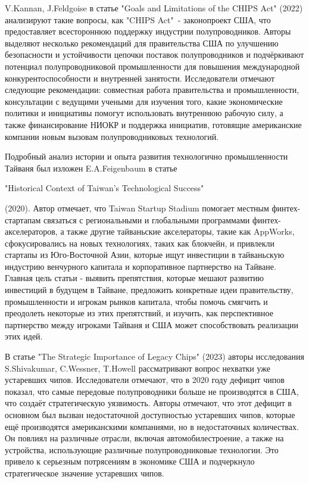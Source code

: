 \documentclass[14pt, a4paper]{extarticle}
\begin{document}
V.Kannan, J.Feldgoise  в статье "Goals and Limitations of the CHIPS Act" (2022) анализируют такие вопросы, как "CHIPS Act"\ - законопроект США, что предоставляет всестороннюю поддержку индустрии полупроводников. Авторы выделяют несколько рекомендаций для правительства США по улучшению безопасности и устойчивости цепочки поставок полупроводников и подчёркивают потенциал полупроводниковой промышленности для повышения международной конкурентоспособности и внутренней занятости. Исследователи отмечают следующие рекомендации: совместная работа правительства и промышленности, консультации с ведущими учеными для изучения того, какие экономические политики и инициативы помогут использовать внутреннюю рабочую силу, а также финансирование НИОКР и поддержка инициатив, готовящие американские компании новым вызовам полупроводниковых технологий.

Подробный анализ истории и опыта развития технологично промышленности Тайваня был изложен E.A.Feigenbaum в статье \begin{english} "Historical Context of Taiwan’s Technological Success"\end{english} (2020). Автор отмечает, что Taiwan Startup Stadium помогает местным финтех-стартапам связаться с региональными и глобальными программами финтех-акселераторов, а также другие тайваньские акселераторы, такие как AppWorks, сфокусировались на новых технологиях, таких как блокчейн, и привлекли стартапы из Юго-Восточной Азии, которые ищут инвестиции в тайваньскую индустрию венчурного капитала и корпоративное партнерство на Тайване. Главная цель статьи - выявить препятствия, которые мешают развитию инвестиций в будущем в Тайване, предложить конкретные идеи правительству, промышленности и игрокам рынков капитала, чтобы помочь смягчить и преодолеть некоторые из этих препятствий, и изучить, как перспективное партнерство между игроками Тайваня и США может способствовать реализации этих идей.

В статье "The Strategic Importance of Legacy Chips" (2023) авторы исследования S.Shivakumar, C.Wessner, T.Howell рассматривают вопрос нехватки уже устаревших чипов. Исследователи отмечают, что в 2020 году дефицит чипов показал, что самые передовые полупроводники больше не производятся в США, что создаёт стратегическую уязвимость. Авторы отмечают, что этот дефицит в основном был вызван недостаточной доступностью устаревших чипов, которые ещё производятся американскими компаниями, но в недостаточных количествах. Он повлиял на различные отрасли, включая автомобилестроение, а также на устройства, использующие различные полупроводниковые технологии. Это привело к серьезным потрясениям в экономике США и подчеркнуло стратегическое значение устаревших чипов.
\end{document}
